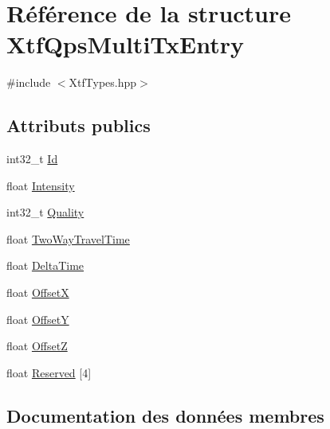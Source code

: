 \hypertarget{structXtfQpsMultiTxEntry}{}\section{Référence de la structure Xtf\+Qps\+Multi\+Tx\+Entry}
\label{structXtfQpsMultiTxEntry}


{\ttfamily \#include $<$Xtf\+Types.\+hpp$>$}

\subsection*{Attributs publics}
\begin{DoxyCompactItemize}
\item 
int32\+\_\+t \hyperlink{structXtfQpsMultiTxEntry_a6218a105192158394bab6f18920b1605}{Id}
\item 
float \hyperlink{structXtfQpsMultiTxEntry_a2922c8947e4813e6d5e01603d6f269de}{Intensity}
\item 
int32\+\_\+t \hyperlink{structXtfQpsMultiTxEntry_af65e56193784508f96292695b02abe34}{Quality}
\item 
float \hyperlink{structXtfQpsMultiTxEntry_a5b10ac85bbb30ba8abad0246a6605006}{Two\+Way\+Travel\+Time}
\item 
float \hyperlink{structXtfQpsMultiTxEntry_a1f0415ee898f6a7677c905f1e3955d53}{Delta\+Time}
\item 
float \hyperlink{structXtfQpsMultiTxEntry_a58628d068efa10ed12a7ddf054921355}{OffsetX}
\item 
float \hyperlink{structXtfQpsMultiTxEntry_a5841ed7f8bc769d4706e5ba0b8a480d0}{OffsetY}
\item 
float \hyperlink{structXtfQpsMultiTxEntry_ac95b80f5c78a6b235c4fdd143353b8b4}{OffsetZ}
\item 
float \hyperlink{structXtfQpsMultiTxEntry_a6c9f75f302ddd83b6623d56bc1956d59}{Reserved} \mbox{[}4\mbox{]}
\end{DoxyCompactItemize}


\subsection{Documentation des données membres}
\mbox{\label{structXtfQpsMultiTxEntry_a1f0415ee898f6a7677c905f1e3955d53}} 
